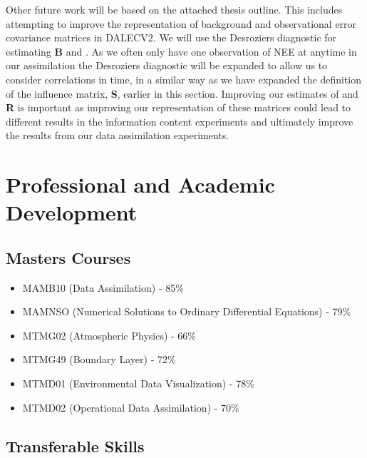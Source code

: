 \documentclass[11pt]{article}
\begin{document}
Other future work will be based on the attached thesis outline. This includes attempting to improve the representation of background and observational error covariance matrices in DALECV2. We will use the Desroziers diagnostic for estimating \textbf{B} and  \citep{desroziers2005diagnosis}. As we often only have one observation of NEE at anytime in our assimilation the Desroziers diagnostic will be expanded to allow us to consider correlations in time, in a similar way as we have expanded the definition of the influence matrix, \textbf{S}, earlier in this section. Improving our estimates of  and \textbf{R} is important as improving our representation of these matrices could lead to different results in the information content experiments and ultimately improve the results from our data assimilation experiments. 



\section{Professional and Academic Development}

\subsection{Masters Courses}
\begin{itemize}
\item MAMB10 (Data Assimilation) - 85\%
\item MAMNSO (Numerical Solutions to Ordinary Differential Equations) - 79\%
\item MTMG02 (Atmospheric Physics) - 66\%
\item MTMG49 (Boundary Layer) - 72\%
\item MTMD01 (Environmental Data Visualization) - 78\%
\item MTMD02 (Operational Data Assimilation) - 70\%
\end{itemize}

\subsection{Transferable Skills}
\end{document}
